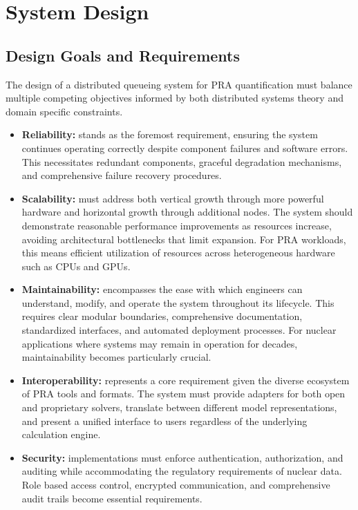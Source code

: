 \chapter{System Design}
\label{chap:system-design}

\section{Design Goals and Requirements}
\label{sec:design-requirements-ds}

The design of a distributed queueing system for PRA quantification must balance multiple competing objectives informed by both distributed systems theory and domain specific constraints.
\begin{itemize}
    \item \textbf{Reliability:} stands as the foremost requirement, ensuring the system continues operating correctly despite component failures and software errors. This necessitates redundant components, graceful degradation mechanisms, and comprehensive failure recovery procedures.

    \item \textbf{Scalability:} must address both vertical growth through more powerful hardware and horizontal growth through additional nodes. The system should demonstrate reasonable performance improvements as resources increase, avoiding architectural bottlenecks that limit expansion. For PRA workloads, this means efficient utilization of resources across heterogeneous hardware such as CPUs and GPUs.

    \item \textbf{Maintainability:} encompasses the ease with which engineers can understand, modify, and operate the system throughout its lifecycle. This requires clear modular boundaries, comprehensive documentation, standardized interfaces, and automated deployment processes. For nuclear applications where systems may remain in operation for decades, maintainability becomes particularly crucial.

    \item \textbf{Interoperability:} represents a core requirement given the diverse ecosystem of PRA tools and formats. The system must provide adapters for both open and proprietary solvers, translate between different model representations, and present a unified interface to users regardless of the underlying calculation engine.

    \item \textbf{Security:} implementations must enforce authentication, authorization, and auditing while accommodating the regulatory requirements of nuclear data. Role based access control, encrypted communication, and comprehensive audit trails become essential requirements.


\end{itemize}
